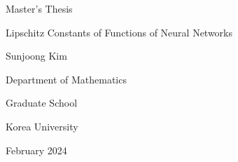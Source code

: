 \documentclass[11pt]{report}
\begin{document}

\newpage   
\begin{center}
{\fontsize{16pt}{16pt}\selectfont Master's Thesis \par}  
\vspace{3cm} %
\huge Lipschitz Constants of Functions of Neural Networks
\par\vspace{4.5cm} %
{\fontsize{16pt}{16pt}\selectfont Sunjoong Kim \par}  %
\vspace{0.5cm}
{\fontsize{16pt}{16pt}\selectfont Department of Mathematics \par}  %
\vspace{1.5cm}
{\fontsize{18pt}{18pt}\selectfont Graduate School \par} 
\vspace{0.5cm}
{\fontsize{18pt}{18pt}\selectfont Korea University \par} 
\vspace{1cm}
{\fontsize{14pt}{14pt}\selectfont February 2024} 
\end{center}
\end{document}
